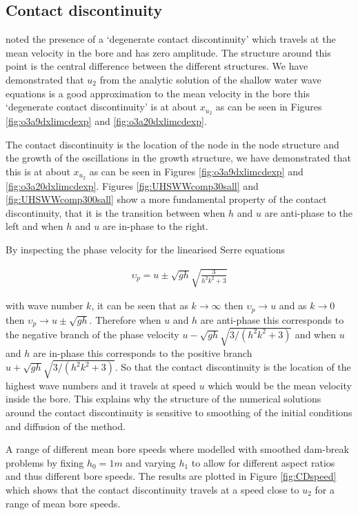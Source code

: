 \documentclass[times]{elsarticle}
\begin{document}
\subsection{Contact discontinuity}
\citet{El-etal-2006} noted the presence of a `degenerate contact discontinuity' which travels at the mean velocity in the bore and has zero amplitude. The structure around this point is the central difference between the different structures. We have demonstrated that $u_2$ from the analytic solution of the shallow water wave equations is a good approximation to the mean velocity in the bore this `degenerate contact discontinuity' is at about $x_{u_2}$ as can be seen in Figures \ref{fig:o3a9dxlimcdexp} and \ref{fig:o3a20dxlimcdexp}.



The contact discontinuity is the location of the node in the node structure \cite{El-etal-2006} and the growth of the oscillations in the growth structure, we have demonstrated that this is at about $x_{u_2}$ as can be seen in Figures \ref{fig:o3a9dxlimcdexp} and \ref{fig:o3a20dxlimcdexp}. Figures \ref{fig:UHSWWcomp30sall} and \ref{fig:UHSWWcomp300sall} show a more fundamental property of the contact discontinuity, that it is the transition between when $h$ and $u$ are anti-phase to the left and when $h$ and $u$ are in-phase to the right.

By inspecting the phase velocity for the linearised Serre equations
\begin{linenomath*}
		\begin{gather}
		\upsilon_p = u \pm \sqrt{gh} \sqrt{\frac{3}{h^2 k^2 + 3}}
		\end{gather}
\end{linenomath*}
with wave number $k$, it can be seen that as $k \rightarrow \infty$ then $\upsilon_p \rightarrow u$ and as $k \rightarrow 0$ then $\upsilon_p \rightarrow u \pm \sqrt{gh}$. Therefore when $u$ and $h$ are anti-phase this corresponds to the negative branch of the phase velocity $u - \sqrt{gh} \sqrt{{3}/\left({h^2 k^2 + 3}\right)}$ and when $u$ and $h$ are in-phase this corresponds to the positive branch  $u + \sqrt{gh} \sqrt{{3}/\left({h^2 k^2 + 3}\right)}$. So that the contact discontinuity is the location of the highest wave numbers and it travels at speed $u$ which would be the mean velocity inside the bore. This explains why the structure of the numerical solutions around the contact discontinuity is sensitive to smoothing of the initial conditions and diffusion of the method.

A range of different mean bore speeds where modelled with smoothed dam-break problems by fixing $h_0=1m$ and varying $h_1$ to allow for different aspect ratios and thus different bore speeds. The results are plotted in Figure \ref{fig:CDspeed} which shows that the contact discontinuity travels at a speed close to $u_2$ for a range of mean bore speeds. 
\end{document}
